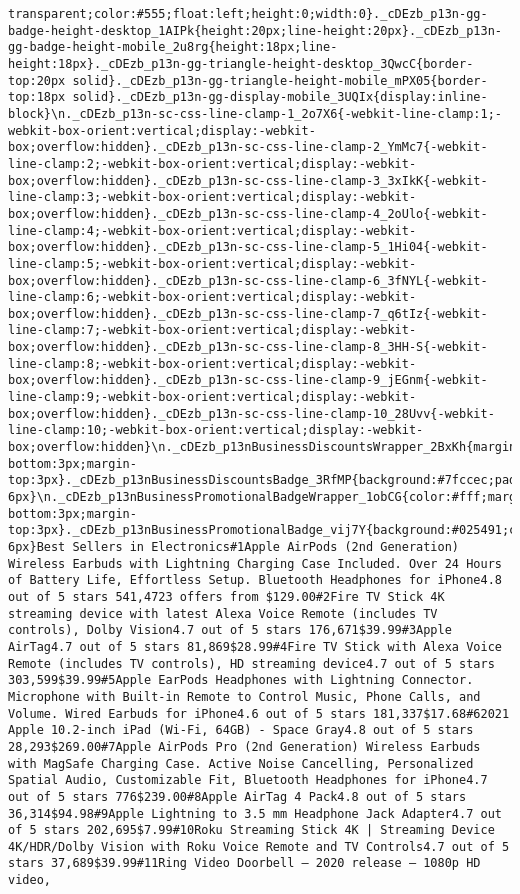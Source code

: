 \documentclass[
]{article}
\begin{document}
\begin{verbatim}
transparent;color:#555;float:left;height:0;width:0}._cDEzb_p13n-gg-badge-height-desktop_1AIPk{height:20px;line-height:20px}._cDEzb_p13n-gg-badge-height-mobile_2u8rg{height:18px;line-height:18px}._cDEzb_p13n-gg-triangle-height-desktop_3QwcC{border-top:20px solid}._cDEzb_p13n-gg-triangle-height-mobile_mPX05{border-top:18px solid}._cDEzb_p13n-gg-display-mobile_3UQIx{display:inline-block}\n._cDEzb_p13n-sc-css-line-clamp-1_2o7X6{-webkit-line-clamp:1;-webkit-box-orient:vertical;display:-webkit-box;overflow:hidden}._cDEzb_p13n-sc-css-line-clamp-2_YmMc7{-webkit-line-clamp:2;-webkit-box-orient:vertical;display:-webkit-box;overflow:hidden}._cDEzb_p13n-sc-css-line-clamp-3_3xIkK{-webkit-line-clamp:3;-webkit-box-orient:vertical;display:-webkit-box;overflow:hidden}._cDEzb_p13n-sc-css-line-clamp-4_2oUlo{-webkit-line-clamp:4;-webkit-box-orient:vertical;display:-webkit-box;overflow:hidden}._cDEzb_p13n-sc-css-line-clamp-5_1Hi04{-webkit-line-clamp:5;-webkit-box-orient:vertical;display:-webkit-box;overflow:hidden}._cDEzb_p13n-sc-css-line-clamp-6_3fNYL{-webkit-line-clamp:6;-webkit-box-orient:vertical;display:-webkit-box;overflow:hidden}._cDEzb_p13n-sc-css-line-clamp-7_q6tIz{-webkit-line-clamp:7;-webkit-box-orient:vertical;display:-webkit-box;overflow:hidden}._cDEzb_p13n-sc-css-line-clamp-8_3HH-S{-webkit-line-clamp:8;-webkit-box-orient:vertical;display:-webkit-box;overflow:hidden}._cDEzb_p13n-sc-css-line-clamp-9_jEGnm{-webkit-line-clamp:9;-webkit-box-orient:vertical;display:-webkit-box;overflow:hidden}._cDEzb_p13n-sc-css-line-clamp-10_28Uvv{-webkit-line-clamp:10;-webkit-box-orient:vertical;display:-webkit-box;overflow:hidden}\n._cDEzb_p13nBusinessDiscountsWrapper_2BxKh{margin-bottom:3px;margin-top:3px}._cDEzb_p13nBusinessDiscountsBadge_3RfMP{background:#7fccec;padding:3px 6px}\n._cDEzb_p13nBusinessPromotionalBadgeWrapper_1obCG{color:#fff;margin-bottom:3px;margin-top:3px}._cDEzb_p13nBusinessPromotionalBadge_vij7Y{background:#025491;color:#fff;padding:4px 6px}Best Sellers in Electronics#1Apple AirPods (2nd Generation) Wireless Earbuds with Lightning Charging Case Included. Over 24 Hours of Battery Life, Effortless Setup. Bluetooth Headphones for iPhone4.8 out of 5 stars 541,4723 offers from $129.00#2Fire TV Stick 4K streaming device with latest Alexa Voice Remote (includes TV controls), Dolby Vision4.7 out of 5 stars 176,671$39.99#3Apple AirTag4.7 out of 5 stars 81,869$28.99#4Fire TV Stick with Alexa Voice Remote (includes TV controls), HD streaming device4.7 out of 5 stars 303,599$39.99#5Apple EarPods Headphones with Lightning Connector. Microphone with Built-in Remote to Control Music, Phone Calls, and Volume. Wired Earbuds for iPhone4.6 out of 5 stars 181,337$17.68#62021 Apple 10.2-inch iPad (Wi-Fi, 64GB) - Space Gray4.8 out of 5 stars 28,293$269.00#7Apple AirPods Pro (2nd Generation) Wireless Earbuds with MagSafe Charging Case. Active Noise Cancelling, Personalized Spatial Audio, Customizable Fit, Bluetooth Headphones for iPhone4.7 out of 5 stars 776$239.00#8Apple AirTag 4 Pack4.8 out of 5 stars 36,314$94.98#9Apple Lightning to 3.5 mm Headphone Jack Adapter4.7 out of 5 stars 202,695$7.99#10Roku Streaming Stick 4K | Streaming Device 4K/HDR/Dolby Vision with Roku Voice Remote and TV Controls4.7 out of 5 stars 37,689$39.99#11Ring Video Doorbell – 2020 release – 1080p HD video, 
\end{verbatim}
\end{document}
